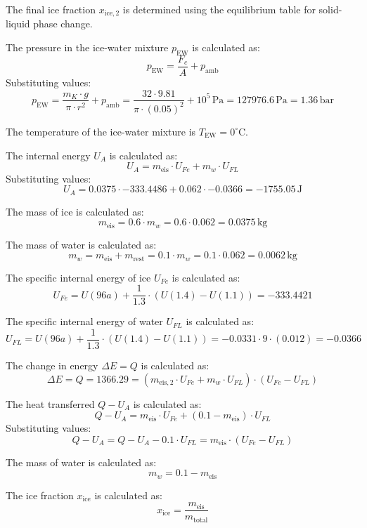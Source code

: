 The final ice fraction \( x_{\text{ice},2} \) is determined using the equilibrium table for solid-liquid phase change.

The pressure in the ice-water mixture \( p_{\text{EW}} \) is calculated as:  
\[
p_{\text{EW}} = \frac{F_c}{A} + p_{\text{amb}}
\]  
Substituting values:  
\[
p_{\text{EW}} = \frac{m_K \cdot g}{\pi \cdot r^2} + p_{\text{amb}} = \frac{32 \cdot 9.81}{\pi \cdot (0.05)^2} + 10^5 \, \text{Pa} = 127976.6 \, \text{Pa} = 1.36 \, \text{bar}
\]  

The temperature of the ice-water mixture is \( T_{\text{EW}} = 0^\circ \text{C} \).  

The internal energy \( U_A \) is calculated as:  
\[
U_A = m_{\text{eis}} \cdot U_{Fe} + m_w \cdot U_{FL}
\]  
Substituting values:  
\[
U_A = 0.0375 \cdot -333.4486 + 0.062 \cdot -0.0366 = -1755.05 \, \text{J}
\]  

The mass of ice is calculated as:  
\[
m_{\text{eis}} = 0.6 \cdot m_w = 0.6 \cdot 0.062 = 0.0375 \, \text{kg}
\]  

The mass of water is calculated as:  
\[
m_w = m_{\text{eis}} + m_{\text{rest}} = 0.1 \cdot m_w = 0.1 \cdot 0.062 = 0.0062 \, \text{kg}
\]  

The specific internal energy of ice \( U_{Fe} \) is calculated as:  
\[
U_{Fe} = U(96a) + \frac{1}{1.3} \cdot (U(1.4) - U(1.1)) = -333.4421
\]  

The specific internal energy of water \( U_{FL} \) is calculated as:  
\[
U_{FL} = U(96a) + \frac{1}{1.3} \cdot (U(1.4) - U(1.1)) = -0.0331 \cdot 9 \cdot (0.012) = -0.0366
\]  

The change in energy \( \Delta E = Q \) is calculated as:  
\[
\Delta E = Q = 1366.29 = (m_{\text{eis},2} \cdot U_{Fe} + m_w \cdot U_{FL}) \cdot (U_{Fe} - U_{FL})
\]  

The heat transferred \( Q - U_A \) is calculated as:  
\[
Q - U_A = m_{\text{eis}} \cdot U_{Fe} + (0.1 - m_{\text{eis}}) \cdot U_{FL}
\]  
Substituting values:  
\[
Q - U_A = Q - U_A - 0.1 \cdot U_{FL} = m_{\text{eis}} \cdot (U_{Fe} - U_{FL})
\]  

The mass of water is calculated as:  
\[
m_w = 0.1 - m_{\text{eis}}
\]  

The ice fraction \( x_{\text{ice}} \) is calculated as:  
\[
x_{\text{ice}} = \frac{m_{\text{eis}}}{m_{\text{total}}}
\]